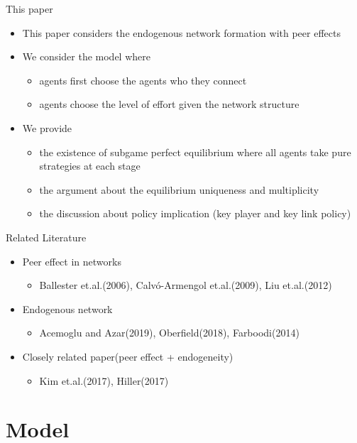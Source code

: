 \documentclass[10pt,dvipdfmx]{beamer}
\begin{document}
\begin{frame}{This paper}
\begin{itemize}
    \item This paper considers the endogenous network formation with peer effects
    \item We consider the model where
    \begin{itemize}
        \item agents first choose the agents who they connect
        \item agents choose the level of effort given the network structure
    \end{itemize}
    \item We provide
    \begin{itemize}
        \item the existence of subgame perfect equilibrium where all agents take pure strategies at each stage
        \item the argument about the equilibrium uniqueness and multiplicity
        \item the discussion about policy implication (key player and key link policy)
    \end{itemize}
\end{itemize}
\end{frame}

\begin{frame}{Related Literature}
\begin{itemize}
    \item Peer effect in networks
    \begin{itemize}
        \item Ballester et.al.(2006), Calv\'{o}-Armengol et.al.(2009), Liu et.al.(2012)
    \end{itemize}
    \item Endogenous network
    \begin{itemize}
        \item Acemoglu and Azar(2019), Oberfield(2018), Farboodi(2014)
    \end{itemize}
    \item Closely related paper(peer effect + endogeneity)
    \begin{itemize}
        \item Kim et.al.(2017), Hiller(2017)
    \end{itemize}
\end{itemize}
\end{frame}


\section{Model}
\end{document}
